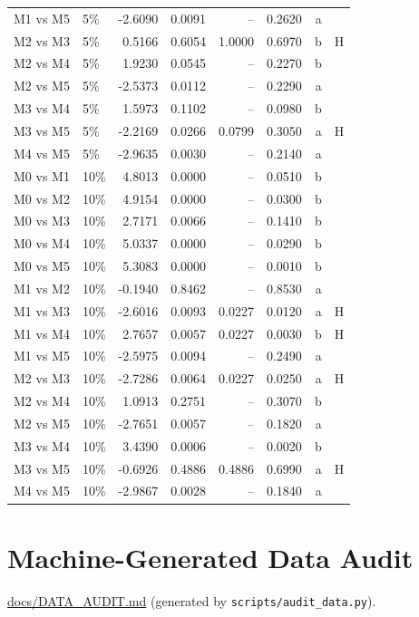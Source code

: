 \documentclass[11pt]{article}
\begin{document}
\begin{table}[ht]
\begin{tabular}{llrrrrrl}
M1 vs M5 & 5\% & -2.6090 & 0.0091 & -- & 0.2620 & a & \\
M2 vs M3 & 5\% & 0.5166 & 0.6054 & 1.0000 & 0.6970 & b & H\\
M2 vs M4 & 5\% & 1.9230 & 0.0545 & -- & 0.2270 & b & \\
M2 vs M5 & 5\% & -2.5373 & 0.0112 & -- & 0.2290 & a & \\
M3 vs M4 & 5\% & 1.5973 & 0.1102 & -- & 0.0980 & b & \\
M3 vs M5 & 5\% & -2.2169 & 0.0266 & 0.0799 & 0.3050 & a & H\\
M4 vs M5 & 5\% & -2.9635 & 0.0030 & -- & 0.2140 & a & \\
M0 vs M1 & 10\% & 4.8013 & 0.0000 & -- & 0.0510 & b & \\
M0 vs M2 & 10\% & 4.9154 & 0.0000 & -- & 0.0300 & b & \\
M0 vs M3 & 10\% & 2.7171 & 0.0066 & -- & 0.1410 & b & \\
M0 vs M4 & 10\% & 5.0337 & 0.0000 & -- & 0.0290 & b & \\
M0 vs M5 & 10\% & 5.3083 & 0.0000 & -- & 0.0010 & b & \\
M1 vs M2 & 10\% & -0.1940 & 0.8462 & -- & 0.8530 & a & \\
M1 vs M3 & 10\% & -2.6016 & 0.0093 & 0.0227 & 0.0120 & a & H\\
M1 vs M4 & 10\% & 2.7657 & 0.0057 & 0.0227 & 0.0030 & b & H\\
M1 vs M5 & 10\% & -2.5975 & 0.0094 & -- & 0.2490 & a & \\
M2 vs M3 & 10\% & -2.7286 & 0.0064 & 0.0227 & 0.0250 & a & H\\
M2 vs M4 & 10\% & 1.0913 & 0.2751 & -- & 0.3070 & b & \\
M2 vs M5 & 10\% & -2.7651 & 0.0057 & -- & 0.1820 & a & \\
M3 vs M4 & 10\% & 3.4390 & 0.0006 & -- & 0.0020 & b & \\
M3 vs M5 & 10\% & -0.6926 & 0.4886 & 0.4886 & 0.6990 & a & H\\
M4 vs M5 & 10\% & -2.9867 & 0.0028 & -- & 0.1840 & a & \\
\hline
\end{tabular}
\end{table}

\section{Machine-Generated Data Audit}\label{sec:audit}
\url{docs/DATA\_AUDIT.md} (generated by \texttt{scripts/audit\_data.py}).
\end{document}
